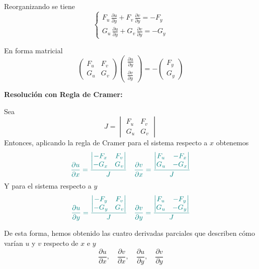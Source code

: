 \documentclass{article}
\begin{document}
Reorganizando se tiene
\[
\begin{cases}
F_u\,\frac{\partial u}{\partial y}+ F_v\,\frac{\partial v}{\partial y}=-F_y \\
G_u\,\frac{\partial u}{\partial y}+ G_v\,\frac{\partial v}{\partial y}=-G_y
\end{cases}
\]

En forma matricial
\[
\begin{pmatrix}
F_u & F_v \\
G_u & G_v
\end{pmatrix}
\begin{pmatrix}
\frac{\partial u}{\partial y} \\
\frac{\partial v}{\partial y}
\end{pmatrix}
=
-\begin{pmatrix}
F_y \\
G_y
\end{pmatrix}
\]

\medskip
\noindent \textbf{Resolución con Regla de Cramer:}

Sea
\[
J = \begin{vmatrix}
F_u & F_v \\
G_u & G_v
\end{vmatrix}
\]
Entonces, aplicando la regla de Cramer para el sistema respecto a \( x \) obtenemos
\[\color{teal}
\frac{\partial u}{\partial x} =
\frac{
\begin{vmatrix}
- F_x & F_v \\
- G_x & G_v
\end{vmatrix}
}{J}
\quad
\frac{\partial v}{\partial x} =
\frac{
\begin{vmatrix}
F_u & - F_x \\
G_u & - G_x
\end{vmatrix}
}{J}
\]
Y para el sistema respecto a \( y \)
\[\color{teal}
\frac{\partial u}{\partial y} =
\frac{
\begin{vmatrix}
- F_y & F_v \\
- G_y & G_v
\end{vmatrix}
}{J}
\quad
\frac{\partial v}{\partial y} =
\frac{
\begin{vmatrix}
F_u & - F_y \\
G_u & - G_y
\end{vmatrix}
}{J}
\]

De esta forma, hemos obtenido las cuatro derivadas parciales que describen cómo varían \( u \) y \( v \) respecto de \( x \) e \( y \)
\[
\frac{\partial u}{\partial x},\quad \frac{\partial v}{\partial x},\quad \frac{\partial u}{\partial y},\quad \frac{\partial v}{\partial y}
\]
\end{document}
